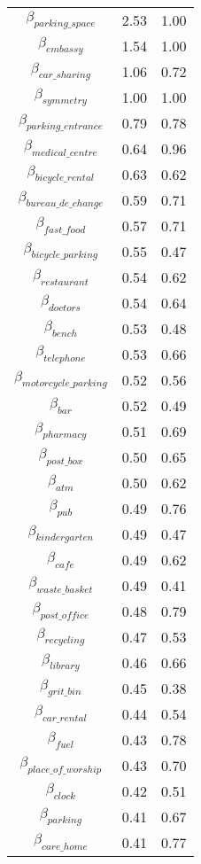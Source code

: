 \begin{tabular}{c|cc}
\hline
$\beta_{parking\_space}$ & 2.53 & 1.00 \\
$\beta_{embassy}$ & 1.54 & 1.00 \\
$\beta_{car\_sharing}$ & 1.06 & 0.72 \\
$\beta_{symmetry}$ & 1.00 & 1.00 \\
$\beta_{parking\_entrance}$ & 0.79 & 0.78 \\
$\beta_{medical\_centre}$ & 0.64 & 0.96 \\
$\beta_{bicycle\_rental}$ & 0.63 & 0.62 \\
$\beta_{bureau\_de\_change}$ & 0.59 & 0.71 \\
$\beta_{fast\_food}$ & 0.57 & 0.71 \\
$\beta_{bicycle\_parking}$ & 0.55 & 0.47 \\
$\beta_{restaurant}$ & 0.54 & 0.62 \\
$\beta_{doctors}$ & 0.54 & 0.64 \\
$\beta_{bench}$ & 0.53 & 0.48 \\
$\beta_{telephone}$ & 0.53 & 0.66 \\
$\beta_{motorcycle\_parking}$ & 0.52 & 0.56 \\
$\beta_{bar}$ & 0.52 & 0.49 \\
$\beta_{pharmacy}$ & 0.51 & 0.69 \\
$\beta_{post\_box}$ & 0.50 & 0.65 \\
$\beta_{atm}$ & 0.50 & 0.62 \\
$\beta_{pub}$ & 0.49 & 0.76 \\
$\beta_{kindergarten}$ & 0.49 & 0.47 \\
$\beta_{cafe}$ & 0.49 & 0.62 \\
$\beta_{waste\_basket}$ & 0.49 & 0.41 \\
$\beta_{post\_office}$ & 0.48 & 0.79 \\
$\beta_{recycling}$ & 0.47 & 0.53 \\
$\beta_{library}$ & 0.46 & 0.66 \\
$\beta_{grit\_bin}$ & 0.45 & 0.38 \\
$\beta_{car\_rental}$ & 0.44 & 0.54 \\
$\beta_{fuel}$ & 0.43 & 0.78 \\
$\beta_{place\_of\_worship}$ & 0.43 & 0.70 \\
$\beta_{clock}$ & 0.42 & 0.51 \\
$\beta_{parking}$ & 0.41 & 0.67 \\
$\beta_{care\_home}$ & 0.41 & 0.77 \\

\end{tabular}
